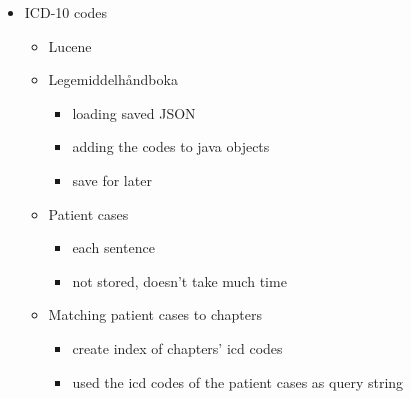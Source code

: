 \begin{itemize}
\item ICD-10 codes
	\begin{itemize}
	\item Lucene
	\item Legemiddelhåndboka
		\begin{itemize}
		\item loading saved JSON
		\item adding the codes to java objects
		\item save for later
		\end{itemize}
	\item Patient cases
		\begin{itemize}
		\item each sentence
		\item not stored, doesn't take much time
		\end{itemize}
	\item Matching patient cases to chapters
		\begin{itemize}
		\item create index of chapters’ icd codes
		\item used the icd codes of the patient cases as query string
		\end{itemize}
	\end{itemize}
\end{itemize}

